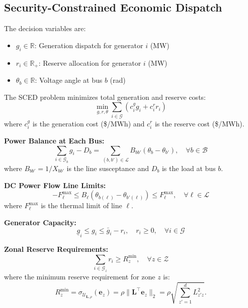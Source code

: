 \documentclass[lettersize,journal]{IEEEtran}
\newcommand{\R}{\mathbb{R}}
\newcommand{\cU}{\mathcal{U}}
\newcommand{\cG}{\mathcal{G}}
\newcommand{\cL}{\mathcal{L}}
\newcommand{\cB}{\mathcal{B}}
\newcommand{\cZ}{\mathcal{Z}}
\newcommand{\norm}[1]{\|#1\|}
\newcommand{\bL}{\bm{L}}
\theoremstyle{definition}
\begin{document}
\subsection{Security-Constrained Economic Dispatch}

The decision variables are:
\begin{itemize}
\item $g_i \in \R$: Generation dispatch for generator $i$ (MW)
\item $r_i \in \R_+$: Reserve allocation for generator $i$ (MW)
\item $\theta_b \in \R$: Voltage angle at bus $b$ (rad)
\end{itemize}

The SCED problem minimizes total generation and reserve costs:
\begin{equation}\label{eq:sced-obj}
\min_{g, r, \theta} \sum_{i \in \cG} \left(c_i^g g_i + c_i^r r_i\right)
\end{equation}
where $c_i^g$ is the generation cost (\$/MWh) and $c_i^r$ is the reserve cost (\$/MWh).

\textbf{Power Balance at Each Bus:}
\begin{equation}\label{eq:power-balance}
\sum_{i \in \cG_b} g_i - D_b = \sum_{(b,b') \in \cL} B_{bb'}(\theta_b - \theta_{b'}), \quad \forall b \in \cB
\end{equation}
where $B_{bb'} = 1/X_{bb'}$ is the line susceptance and $D_b$ is the load at bus $b$.

\textbf{DC Power Flow Line Limits:}
\begin{equation}\label{eq:line-limits}
-F_\ell^{\max} \leq B_\ell(\theta_{b(\ell)} - \theta_{b'(\ell)}) \leq F_\ell^{\max}, \quad \forall \ell \in \cL
\end{equation}
where $F_\ell^{\max}$ is the thermal limit of line $\ell$.

\textbf{Generator Capacity:}
\begin{equation}\label{eq:gen-capacity}
\underline{g}_i \leq g_i \leq \bar{g}_i - r_i, \quad r_i \geq 0, \quad \forall i \in \cG
\end{equation}

\textbf{Zonal Reserve Requirements:}
\begin{equation}\label{eq:zonal-reserve}
\sum_{i \in \cG_z} r_i \geq R_z^{\min}, \quad \forall z \in \cZ
\end{equation}
where the minimum reserve requirement for zone $z$ is:
\begin{equation}\label{eq:reserve-requirement}
R_z^{\min} = \sigma_{\cU_{\bL,\rho}}(\bm{e}_z) = \rho \norm{\bL^\top \bm{e}_z}_2 = \rho \sqrt{\sum_{z'=1}^{d} L_{z'z}^2}.
\end{equation}
\end{document}
